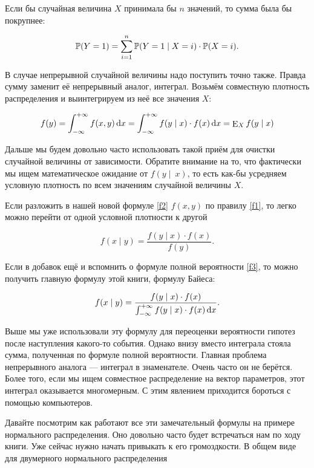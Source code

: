 Если бы случайная величина $X$ принимала бы $n$ значений, то сумма была бы покрупнее: 

\[
\mathbb{P}(Y=1) = \sum_{i=1}^n \mathbb{P}(Y = 1 \mid X = i) \cdot \mathbb{P}(X = i).
\]

В случае непрерывной случайной величины надо поступить точно также. Правда сумму заменит её непрерывный аналог, интеграл. Возьмём совместную плотность распределения и выинтегрируем из неё все значения $X$:

\begin{equation}\label{f3}
f(y) = \int_{-\infty}^{+\infty} f(x,y) \,\mathrm{d}x = \int_{-\infty}^{+\infty} f(y \mid x) \cdot f(x) \,\mathrm{d}x = \operatorname{\mathop{E}}_{X} f(y \mid x)
\end{equation}

Дальше мы будем довольно часто использовать такой приём для очистки случайной величины от зависимости. Обратите внимание на то, что фактически мы ищем математическое ожидание от $f(y\mid~x)$, то есть как-бы усредняем условную плотность по всем значениям случайной величины $X$.

Если разложить в нашей новой формуле \eqref{f2} $f(x,y)$ по правилу \eqref{f1}, то легко можно перейти от одной условной плотности к другой

\begin{equation}
f(x \mid y) = \frac{ f(y \mid x) \cdot f(x)}{f(y)}.
\end{equation}

Если в добавок ещё и вспомнить о формуле полной вероятности \eqref{f3}, то можно получить главную формулу этой книги, формулу Байеса:

\[ f(x \mid y) = \frac{ f(y \mid x) \cdot f(x)}{\int_{-\infty}^{+\infty} f(y \mid x) \cdot f(x) \,\mathrm{d}x}. \]

Выше мы уже использовали эту формулу для переоценки вероятности гипотез после наступления какого-то события. Однако внизу вместо интеграла стояла сумма, полученная по формуле полной вероятности.  Главная проблема непрерывного аналога --- интеграл в знаменателе. Очень часто он не берётся. Более того, если мы ищем совместное распределение на вектор параметров, этот интеграл оказывается многомерным. С этим явлением приходится бороться с помощью компьютеров.  

Давайте посмотрим как работают все эти замечательный формулы на примере нормального распределения. Оно довольно часто будет встречаться нам по ходу книги. Уже сейчас нужно начать привыкать к его громоздкости.  В общем виде для двумерного нормального распределения

